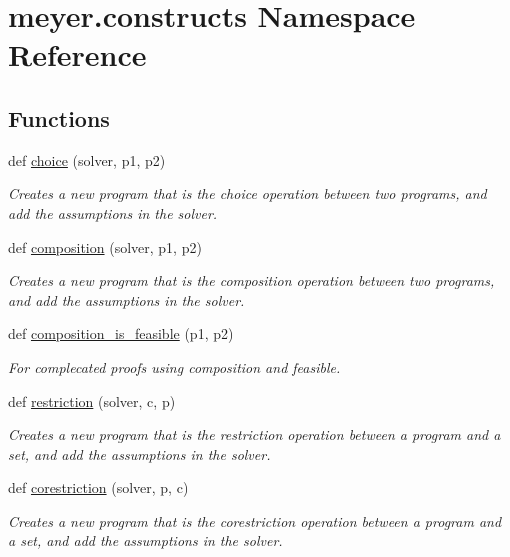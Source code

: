 \hypertarget{namespacemeyer_1_1constructs}{}\section{meyer.\+constructs Namespace Reference}
\label{namespacemeyer_1_1constructs}
\subsection*{Functions}
\begin{DoxyCompactItemize}
\item 
def \hyperlink{namespacemeyer_1_1constructs_ae659fbbcaf6239c8c8a1e79ee97b7134}{choice} (solver, p1, p2)
\begin{DoxyCompactList}\small\item\em Creates a new program that is the choice operation between two programs, and add the assumptions in the solver. \end{DoxyCompactList}\item 
def \hyperlink{namespacemeyer_1_1constructs_a8bb4c363d27270f0a745f816d1e75814}{composition} (solver, p1, p2)
\begin{DoxyCompactList}\small\item\em Creates a new program that is the composition operation between two programs, and add the assumptions in the solver. \end{DoxyCompactList}\item 
def \hyperlink{namespacemeyer_1_1constructs_ac7888a6a7eeec7bbd29aad3bc2791619}{composition\+\_\+is\+\_\+feasible} (p1, p2)
\begin{DoxyCompactList}\small\item\em For complecated proofs using composition and feasible. \end{DoxyCompactList}\item 
def \hyperlink{namespacemeyer_1_1constructs_adcab11ce5ea89886576f593f6d2926f6}{restriction} (solver, c, p)
\begin{DoxyCompactList}\small\item\em Creates a new program that is the restriction operation between a program and a set, and add the assumptions in the solver. \end{DoxyCompactList}\item 
def \hyperlink{namespacemeyer_1_1constructs_ad3cf2dbc20a62597059a34e860d64515}{corestriction} (solver, p, c)
\begin{DoxyCompactList}\small\item\em Creates a new program that is the corestriction operation between a program and a set, and add the assumptions in the solver. \end{DoxyCompactList}\item 

\end{DoxyCompactItemize}
